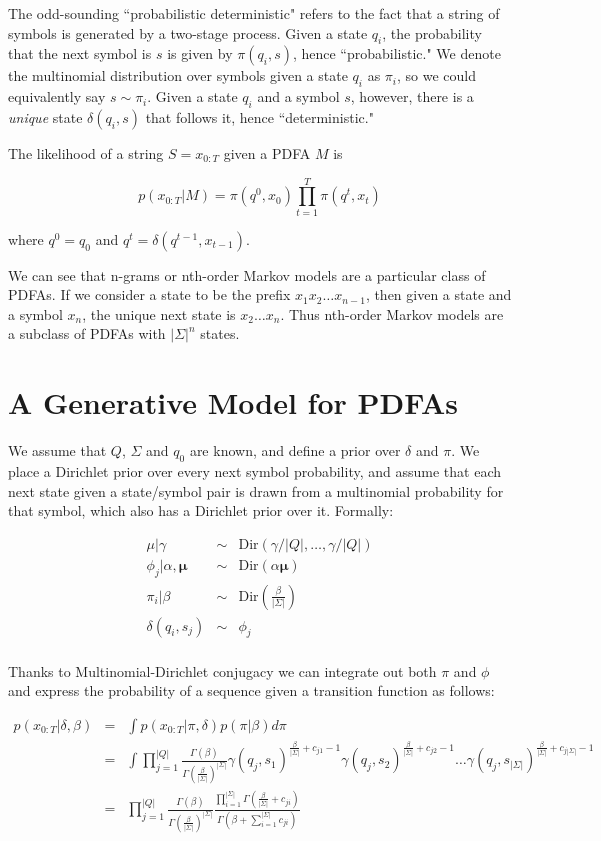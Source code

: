 \documentclass[11pt]{article}
\begin{document}
The odd-sounding ``probabilistic deterministic" refers to the fact that a string of symbols is generated by a two-stage process.  Given a state $q_i$, the probability that the next symbol is $s$ is given by $\pi(q_i,s)$, hence ``probabilistic."  We denote the multinomial distribution over symbols given a state $q_i$ as $\pi_i$, so we could equivalently say $s \sim \pi_i$.  Given a state $q_i$ and a symbol $s$, however, there is a {\it unique} state $\delta(q_i,s)$ that follows it, hence ``deterministic."  

The likelihood of a string $S = x_{0:T}$ given a PDFA $M$ is

\[ p(x_{0:T}|M) = \pi(q^0,x_0)\prod_{t=1}^T \pi(q^t,x_t) \]

where $q^0 = q_0$ and $q^t = \delta(q^{t-1},x_{t-1})$.

We can see that n-grams or nth-order Markov models are a particular class of PDFAs.  If we consider a state to be the prefix $x_1 x_2 \ldots x_{n-1}$, then given a state and a symbol $x_n$, the unique next state is $x_2 \ldots x_n$.  Thus nth-order Markov models are a subclass of PDFAs with $|\Sigma|^n$ states.

\section{A Generative Model for PDFAs}

We assume that $Q$, $\Sigma$ and $q_0$ are known, and define a prior over $\delta$ and $\pi$.  We place a Dirichlet prior over every next symbol probability, and assume that each next state given a state/symbol pair is drawn from a multinomial probability for that symbol, which also has a Dirichlet prior over it.  Formally:

\begin{eqnarray*}
\mu|\gamma & \sim & \mathrm{Dir}\left(\gamma/|Q|,\ldots,\gamma/|Q|\right) \\
\phi_{j}|\alpha,\mathbf{\mu}  & \sim & \mathrm{Dir}(\alpha\mathbf{\mu}) \\
\pi_{i}|\beta & \sim & \mathrm{Dir}\left(\frac{\beta}{|\Sigma|}\right)\\
\delta(q_i,s_j) & \sim & \phi_{j} \\
\end{eqnarray*}

Thanks to Multinomial-Dirichlet conjugacy we can integrate out both $\pi$ and $\phi$ and express the probability of a sequence given a transition function as follows:

\begin{eqnarray*}
 p(x_{0:T}|\delta,\beta) & = & \int p(x_{0:T}|\pi,\delta) p(\pi|\beta) d\pi \\
 & = &  \int \prod_{j=1}^{|Q|} \frac{\Gamma(\beta)}{\Gamma(\frac{\beta}{|\Sigma|})^{|\Sigma|}} \gamma(q_j,s_1)^{\frac{\beta}{|\Sigma|}+c_{j1}-1} \gamma(q_j,s_2)^{\frac{\beta}{|\Sigma|}+c_{j2}-1} \ldots \gamma(q_j,s_{|\Sigma|})^{\frac{\beta}{|\Sigma|}+c_{j|\Sigma|}-1} \\
 & = & \prod_{j=1}^{|Q|} \frac{\Gamma(\beta)}{\Gamma(\frac{\beta}{|\Sigma|})^{|\Sigma|}} \frac{\prod_{i=1}^{|\Sigma|}\Gamma(\frac{\beta}{|\Sigma|} + c_{ji})}{\Gamma(\beta + \sum_{i=1}^{|\Sigma|} c_{ji})}
 \end{eqnarray*}
 
\end{document}
